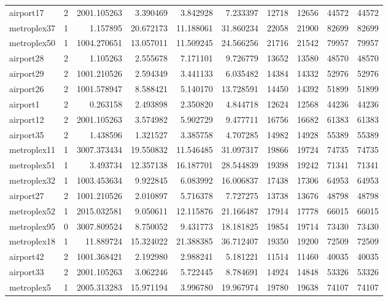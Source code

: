 \begin{longtable}{|l|r|r|r|r|r|r|r|r|r|}
airport17 & 2 & 2001.105263 & 3.390469 & 3.842928 & 7.233397 & 12718 & 12656 & 44572 & 44572 \\
metroplex37 & 1 & 1.157895 & 20.672173 & 11.188061 & 31.860234 & 22058 & 21900 & 82699 & 82699 \\
metroplex50 & 1 & 1004.270651 & 13.057011 & 11.509245 & 24.566256 & 21716 & 21542 & 79957 & 79957 \\
airport28 & 2 & 1.105263 & 2.555678 & 7.171101 & 9.726779 & 13652 & 13580 & 48570 & 48570 \\
airport29 & 2 & 1001.210526 & 2.594349 & 3.441133 & 6.035482 & 14384 & 14332 & 52976 & 52976 \\
airport26 & 2 & 1001.578947 & 8.588421 & 5.140170 & 13.728591 & 14450 & 14392 & 51899 & 51899 \\
airport1 & 2 & 0.263158 & 2.493898 & 2.350820 & 4.844718 & 12624 & 12568 & 44236 & 44236 \\
airport12 & 2 & 2001.105263 & 3.574982 & 5.902729 & 9.477711 & 16756 & 16682 & 61383 & 61383 \\
airport35 & 2 & 1.438596 & 1.321527 & 3.385758 & 4.707285 & 14982 & 14928 & 55389 & 55389 \\
metroplex11 & 1 & 3007.373434 & 19.550832 & 11.546485 & 31.097317 & 19866 & 19724 & 74735 & 74735 \\
metroplex51 & 1 & 3.493734 & 12.357138 & 16.187701 & 28.544839 & 19398 & 19242 & 71341 & 71341 \\
metroplex32 & 1 & 1003.453634 & 9.922845 & 6.083992 & 16.006837 & 17438 & 17306 & 64953 & 64953 \\
airport27 & 2 & 1001.210526 & 2.010897 & 5.716378 & 7.727275 & 13738 & 13676 & 48798 & 48798 \\
metroplex52 & 1 & 2015.032581 & 9.050611 & 12.115876 & 21.166487 & 17914 & 17778 & 66015 & 66015 \\
metroplex95 & 0 & 3007.809524 & 8.750052 & 9.431773 & 18.181825 & 19854 & 19714 & 73430 & 73430 \\
metroplex18 & 1 & 11.889724 & 15.324022 & 21.388385 & 36.712407 & 19350 & 19200 & 72509 & 72509 \\
airport42 & 2 & 1001.368421 & 2.192980 & 2.988241 & 5.181221 & 11514 & 11460 & 40035 & 40035 \\
airport33 & 2 & 2001.105263 & 3.062246 & 5.722445 & 8.784691 & 14924 & 14848 & 53326 & 53326 \\
metroplex5 & 1 & 2005.313283 & 15.971194 & 3.996780 & 19.967974 & 19780 & 19638 & 74107 & 74107 \\

\end{longtable}
